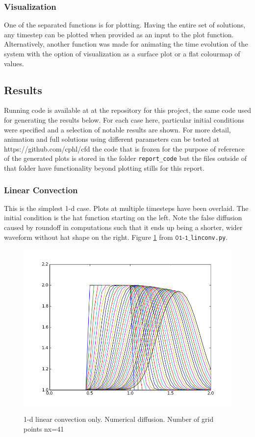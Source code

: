 \documentclass[11pt]{article}
\begin{document}
{\subsubsection{Visualization}
One of the separated functions is for plotting. Having the entire set of solutions, any
timestep can be plotted when provided as an input to the plot function. Alternatively,
another function was made for animating the time evolution of the system with the option
of visualization as a surface plot or a flat colourmap of values.


\subsection{Results}

Running code is available at at the repository for this project, the same code used for
generating the results below. For each case here, particular initial conditions were specified
and a selection of notable results are shown. For more detail, animation and full solutions
using different parameters can be tested at https://github.com/cphl/cfd the code that is
frozen for the purpose of reference of the generated plots is stored in the folder 
\texttt{report\_code} but the files outside of that folder have functionality beyond
plotting stills for this report.


\subsubsection{Linear Convection}\label{cfl+friends}
This is the simplest 1-d case. Plots at multiple timesteps have been overlaid.
The initial condition is the hat function starting on the left.
Note the false diffusion caused by roundoff in computations such that it ends up being a
shorter, wider waveform without hat shape on the right. Figure \ref{fig:num_diff} from
$\texttt{01-1\_}$\texttt{linconv.py}.

	\begin{figure}[H]
	\centering
	\caption{1-d linear convection only. Numerical diffusion. Number of grid points nx=41}
	\includegraphics[scale=0.6]{num_diff.png}
	\label{fig:num_diff}
	\end{figure}

}
\end{document}
